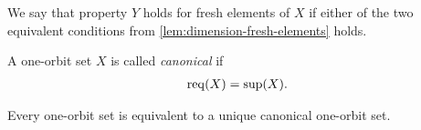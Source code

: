 \begin{definition}
    We say that property $Y$ holds for fresh elements of $X$ if either of the two equivalent conditions from \cref{lem:dimension-fresh-elements} holds.
\end{definition}





\begin{definition}
    A one-orbit set $X$ is called \emph{canonical} if 
    \begin{align*}
    \operatorname{req}(X) = \sup(X).
    \end{align*}
\end{definition}

\begin{lemma}
    Every one-orbit set is equivalent to a unique canonical one-orbit set. 
\end{lemma}